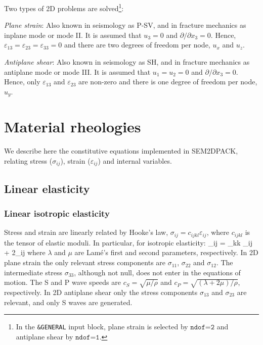 Two types of 2D problems are solved\footnote{In the \texttt{\&GENERAL} input block,
plane strain is selected by $\texttt{ndof=2}$ and antiplane shear by $\texttt{ndof=1}$.}: 
\begin{sitemize}
\item \emph{Plane strain}: 
Also known in seismology as P-SV, and in fracture mechanics as inplane mode or mode II.
It is assumed that $u_3=0$ and $\partial / \partial x_3 = 0$.
Hence, $\varepsilon_{13}=\varepsilon_{23}=\varepsilon_{33}=0$
and there are two degrees of freedom per node, $u_x$ and $u_z$.
\item \emph{Antiplane shear}: 
Also known in seismology as SH, and in fracture mechanics as antiplane mode or mode III.
It is assumed that $u_1=u_2=0$ and $\partial / \partial x_3 = 0$. 
Hence, only $\varepsilon_{13}$ and $\varepsilon_{23}$ are non-zero
and there is one degree of freedom per node, $u_y$.
\end{sitemize}

\section{Material rheologies}
\label{Sec:rheol}

We describe here the constitutive equations implemented in SEM2DPACK,
relating stress ($\sigma_{ij}$), strain ($\varepsilon_{ij}$) and internal variables.

\subsection{Linear elasticity}

\subsubsection{Linear isotropic elasticity}

Stress and strain are linearly related by Hooke's law, 
$\sigma_{ij} = c_{ijkl} \varepsilon_{ij}$,
where $c_{ijkl}$ is the tensor of elastic moduli.
In particular, for isotropic elasticity:
\eq
  \sigma_{ij} = \lambda \varepsilon_{kk} \delta_{ij} + 2\mu \varepsilon_{ij}
\en
where $\lambda$ and $\mu$ are Lam\'e's first and second parameters, respectively.
In 2D plane strain the only relevant stress components are $\sigma_{11}$, $\sigma_{22}$ and $\sigma_{12}$.
The intermediate stress $\sigma_{33}$, although not null, does not enter in the equations of motion.
The S and P wave speeds are $c_S = \sqrt{\mu/\rho}$ and $c_P = \sqrt{(\lambda+2\mu)/\rho}$, respectively.
In 2D antiplane shear only the stress components $\sigma_{13}$ and $\sigma_{23}$ are relevant,
and only S waves are generated.

